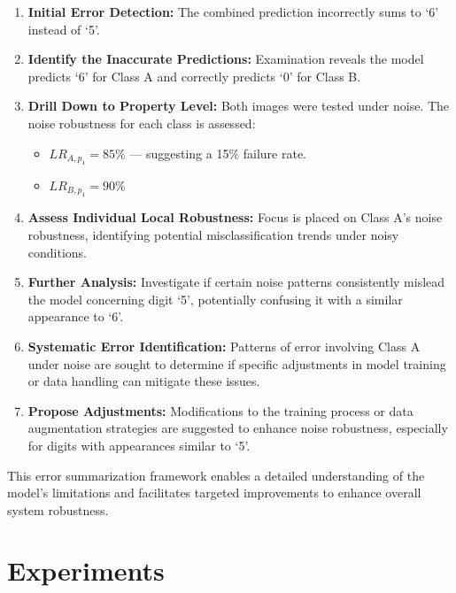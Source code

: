 \documentclass[10pt, conference, a4paper, final]{IEEEtran}
\begin{document}
\begin{enumerate}
    \item \textbf{Initial Error Detection:}
        The combined prediction incorrectly sums to `6' instead of `5'.

    \item \textbf{Identify the Inaccurate Predictions:}
        Examination reveals the model predicts `6' for Class A and correctly predicts `0' for Class B.

    \item \textbf{Drill Down to Property Level:}
        Both images were tested under noise. The noise robustness for each class is assessed:
        \begin{itemize}
            \item \( LR_{A,p_1} = 85\% \) — suggesting a 15\% failure rate.
            \item \( LR_{B,p_1} = 90\% \)
        \end{itemize}

    \item \textbf{Assess Individual Local Robustness:}
        Focus is placed on Class A's noise robustness, identifying potential misclassification trends under noisy conditions.

    \item \textbf{Further Analysis:}
        Investigate if certain noise patterns consistently mislead the model concerning digit `5', potentially confusing it with a similar appearance to `6'.

    \item \textbf{Systematic Error Identification:}
        Patterns of error involving Class A under noise are sought to determine if specific adjustments in model training or data handling can mitigate these issues.

    \item \textbf{Propose Adjustments:}
        Modifications to the training process or data augmentation strategies are suggested to enhance noise robustness, especially for digits with appearances similar to `5'.
\end{enumerate}

This error summarization framework enables a detailed understanding of the model’s limitations and facilitates targeted improvements to enhance overall system robustness.




\section{Experiments}
\end{document}
